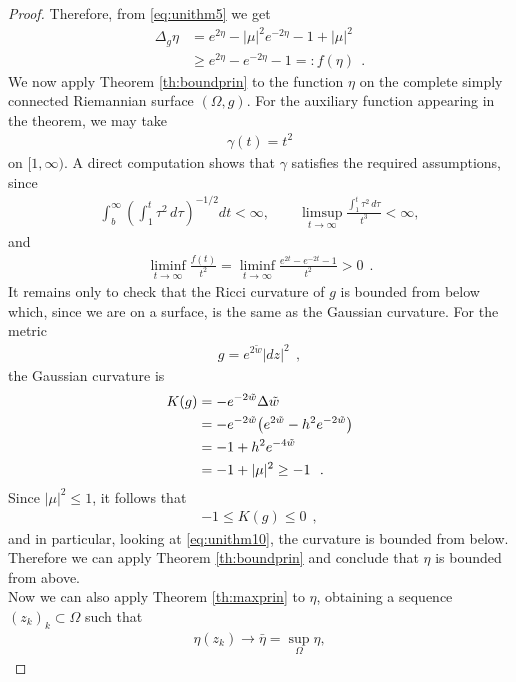 \documentclass[a4paper,11pt,openright,twoside]{book}
\renewcommand{\Omega}{\varOmega}
\newcommand{\1}{\mathds{1}}
\theoremstyle{plain}
\theoremstyle{definition}
\theoremstyle{remark}
\begin{document}
\begin{proof}
	Therefore, from \eqref{eq:unithm5} we get
	\begin{align*}
		\Delta_g \eta
		&=
		e^{2\eta}-|\mu|^2 e^{-2\eta}-1+|\mu|^2\\
		&\geq
		e^{2\eta}-e^{-2\eta}-1
		=: f(\eta)
		\ \ .
	\end{align*}
	We now apply Theorem \ref{th:boundprin} to the function $\eta$ on the complete simply connected Riemannian surface $(\Omega,g)$. For the auxiliary function appearing in the theorem, we may take
	\begin{align*}
		\gamma(t)=t^2
	\end{align*}
	on $[1,\infty)$. A direct computation shows that $\gamma$ satisfies the required assumptions, since
	\begin{align*}
		\int_b^\infty \left(\int_1^t \tau^2\,d\tau\right)^{-1/2}dt < \infty,
		\qquad
		\limsup_{t\to\infty}\frac{\int_1^t \tau^2\,d\tau}{t^3}<\infty,
	\end{align*}
	and
	\begin{align*}
		\liminf_{t\to\infty}\frac{f(t)}{t^2}
		=
		\liminf_{t\to\infty}\frac{e^{2t}-e^{-2t}-1}{t^2}
		>0
		\ \ .
	\end{align*}
	It remains only to check that the Ricci curvature of $g$ is bounded from below which, since we are on a surface, is the same as the Gaussian curvature. 
	For the metric
	\begin{align*}
		g=e^{2\tilde w}|dz|^2
		\ \ ,
	\end{align*}
	the Gaussian curvature is
	\begin{align}\label{eq:unithm10}
		K(g)
		&=
		-e^{-2\tilde w}\Delta \tilde w\notag\\
		&=
		-e^{-2\tilde w}\bigl(e^{2\tilde w}-h^2e^{-2\tilde w}\bigr)\notag\\
		&=
		-1+h^2e^{-4\tilde w}\notag\\
		&=
		-1+|\mu|^2\geq -1
		\ \ .
	\end{align}
	Since $|\mu|^2\leq 1$, it follows that
	\begin{align*}
		-1\leq K(g)\leq 0
		\ \ ,
	\end{align*}
	and in particular, looking at \eqref{eq:unithm10}, the curvature is bounded from below. Therefore we can apply Theorem \ref{th:boundprin} and conclude that $\eta$ is bounded from above.\\
	Now we can also apply Theorem \ref{th:maxprin} to $\eta$, obtaining a sequence $(z_k)_k\subset \Omega$ such that
	\begin{align*}
		\eta(z_k)\to \bar\eta=\sup_\Omega \eta,

\end{align*}
\end{proof}
\end{document}
